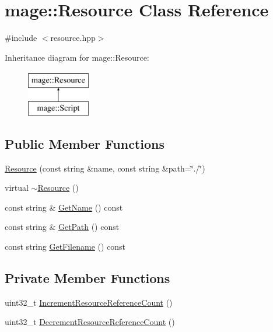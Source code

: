 \hypertarget{classmage_1_1_resource}{}\section{mage\+:\+:Resource Class Reference}
\label{classmage_1_1_resource}


{\ttfamily \#include $<$resource.\+hpp$>$}

Inheritance diagram for mage\+:\+:Resource\+:\begin{figure}[H]
\begin{center}
\leavevmode
\includegraphics[height=2.000000cm]{classmage_1_1_resource}
\end{center}
\end{figure}
\subsection*{Public Member Functions}
\begin{DoxyCompactItemize}
\item 
\hyperlink{classmage_1_1_resource_a7b4febc86646d51ac116732af01abcaf}{Resource} (const string \&name, const string \&path=\char`\"{}./\char`\"{})
\item 
virtual \hyperlink{classmage_1_1_resource_a80112db991a7dfd1dc0b24967981ac60}{$\sim$\+Resource} ()
\item 
const string \& \hyperlink{classmage_1_1_resource_a77713b0c74f8983afc2d42843afe8cbe}{Get\+Name} () const
\item 
const string \& \hyperlink{classmage_1_1_resource_a2ef6c6937947b56cbabc569e3a63ca71}{Get\+Path} () const
\item 
const string \hyperlink{classmage_1_1_resource_a3235bf2744390d5957b9b4038e4bb512}{Get\+Filename} () const
\end{DoxyCompactItemize}
\subsection*{Private Member Functions}
\begin{DoxyCompactItemize}
\item 
uint32\+\_\+t \hyperlink{classmage_1_1_resource_a0aee4b36717494677dbd6ba799f11ab4}{Increment\+Resource\+Reference\+Count} ()
\item 
uint32\+\_\+t \hyperlink{classmage_1_1_resource_a225b37285aa32d893a07d5b492ea99f9}{Decrement\+Resource\+Reference\+Count} ()
\end{DoxyCompactItemize}
